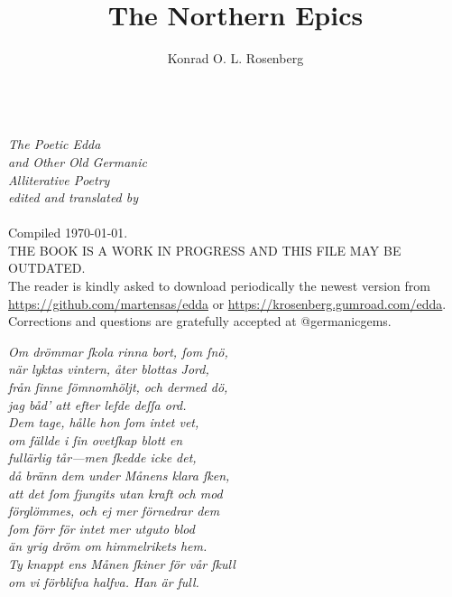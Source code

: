 \title{The Northern Epics}
\author{Konrad O. L. Rosenberg}

\begin{titlingpage}
  \makeatletter
  \centering
  \HUGE \textsc{\@title} \\
  \vspace{1cm}
  \Huge \emph{The Poetic Edda} \\
  \Huge \emph{and Other Old Germanic \\ Alliterative Poetry} \\
  \vspace{1cm}
  \Large\emph{edited and translated by} \\
  \vspace{0.3cm}
  \huge \@author \\
  \vspace{4cm}
  \Large Compiled \today. \\
  \vspace{1cm}
  THE BOOK IS A WORK IN PROGRESS AND THIS FILE MAY BE OUTDATED. \\
  The reader is kindly asked to download periodically the newest version from \url{https://github.com/martensas/edda} or \url{https://krosenberg.gumroad.com/edda}. \\
  Corrections and questions are gratefully accepted at @germanicgems.
  \makeatother
\end{titlingpage}

\newpage\thispagestyle{empty}

\vspace*{\fill}

\begin{center}{\huge \emph{Om drömmar ſkola rinna bort, ſom ſnö, \\
när lyktas vintern, åter blottas Jord, \\
från ſinne ſömnomhöljt, och dermed dö, \\
jag båd’ att efter lefde deſſa ord. \\
Dem tage, hålle hon ſom intet vet, \\
om fällde i ſin ovetſkap blott en \\
fullärlig tår---men ſkedde icke det, \\
då bränn dem under Månens klara ſken, \\
att det ſom ſjungits utan kraft och mod \\
förglömmes, och ej mer förnedrar dem \\
ſom förr för intet mer utguto blod \\
än yrig dröm om himmelrikets hem. \\
Ty knappt ens Månen ſkiner för vår ſkull \\
om vi förblifva halfva.  Han är full. \\}}
\end{center}

